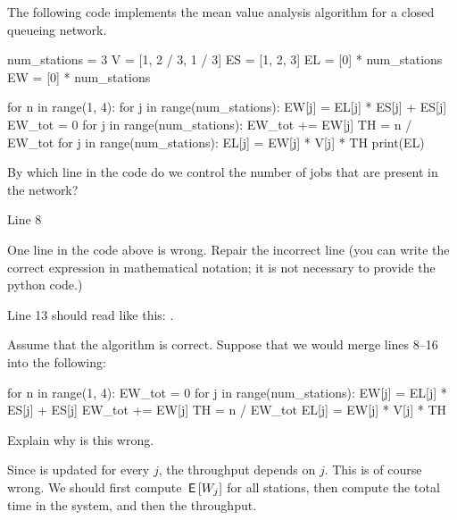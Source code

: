The following code implements the mean value analysis algorithm for a closed queueing network.

\begin{pyverbatim}[stdout][numbers=left]
num_stations = 3
V = [1, 2 / 3, 1 / 3]
ES = [1, 2, 3]
EL = [0] * num_stations
EW = [0] * num_stations


for n in range(1, 4):
    for j in range(num_stations):
        EW[j] = EL[j] * ES[j] + ES[j]
    EW_tot = 0
    for j in range(num_stations):
        EW_tot += EW[j]
    TH = n / EW_tot
    for j in range(num_stations):
        EL[j] =  EW[j] *  V[j] * TH
    print(EL)

  \end{pyverbatim}  

\begin{exercise}[201904]
  By which line in the code do we control the number of jobs that are present in the network?
\begin{solution}
    Line 8
\end{solution}
\end{exercise}

\begin{exercise}[201904]
  One line in the code above is wrong.
  Repair the incorrect line (you can write the correct expression in mathematical notation; it is not necessary to provide the python code.)
\begin{solution}
Line 13 should read like this: .
\end{solution}
\end{exercise}

\begin{exercise}[201904]
  Assume that the algorithm is correct.
  Suppose that we would merge lines 8--16 into the following:
\begin{pyverbatim}[stdout][numbers=left]
for n in range(1, 4):
    EW_tot = 0
    for j in range(num_stations):
        EW[j] = EL[j] * ES[j] + ES[j]
        EW_tot += EW[j]
        TH = n / EW_tot
        EL[j] =  EW[j] *  V[j] * TH
      \end{pyverbatim}
      Explain why is this wrong.
\begin{solution}
Since  is updated for every $j$, the throughput depends on $j$. This is of course wrong. We should first compute  $\,\mathsf{E}\left[W_j\right]$ for all stations, then compute the total time in the system, and then the throughput. 
\end{solution}
\end{exercise}  


